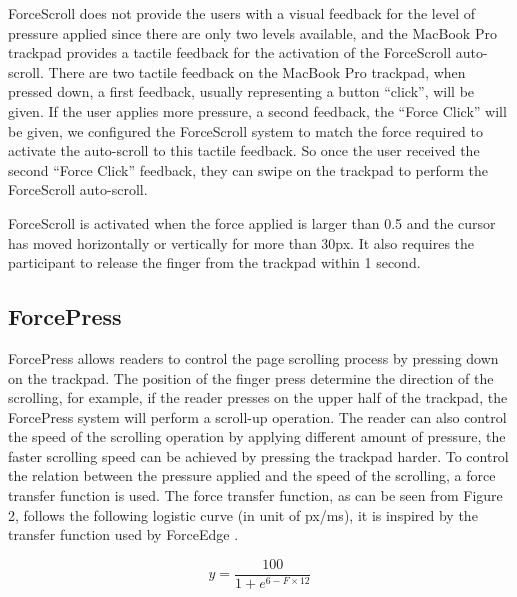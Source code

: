 \documentclass{sigchi}
\begin{document}
ForceScroll does not provide the users with a visual feedback for the level of pressure applied since there are only two levels available, and the MacBook Pro trackpad provides a tactile feedback for the activation of the ForceScroll auto-scroll. There are two tactile feedback on the MacBook Pro trackpad, when pressed down, a first feedback, usually representing a button ``click'', will be given. If the user applies more pressure, a second feedback, the ``Force Click'' will be given, we configured the ForceScroll system to match the force required to activate the auto-scroll to this tactile feedback. So once the user received the second ``Force Click'' feedback, they can swipe on the trackpad to perform the ForceScroll auto-scroll. 


ForceScroll is activated when the force applied is larger than 0.5 and the cursor has moved horizontally or vertically for more than 30px. It also requires the participant to release the finger from the trackpad within 1 second.

\subsection{ForcePress}
ForcePress allows readers to control the page scrolling process by pressing down on the trackpad. The position of the finger press determine the direction of the scrolling, for example, if the reader presses on the upper half of the trackpad, the ForcePress system will perform a scroll-up operation. The reader can also control the speed of the scrolling operation by applying different amount of pressure, the faster scrolling speed can be achieved by pressing the trackpad harder. To control the relation between the pressure applied and the speed of the scrolling, a force transfer function is used. The force transfer function, as can be seen from Figure 2, follows the following logistic curve (in unit of px/ms), it is inspired by the transfer function used by ForceEdge \cite{antoine2017forceedge}.

\[
	y = \frac{100}{1 + e^{6 - F \times 12}}
\]
\end{document}
